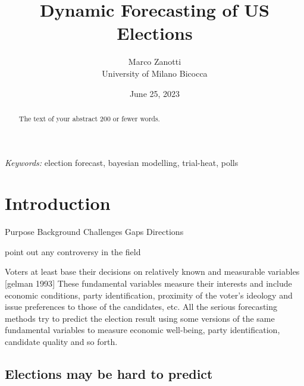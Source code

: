 \documentclass[
  12pt]{article}
\begin{document}
\def\spacingset#1{\renewcommand{\baselinestretch}%
{#1}\small\normalsize} \spacingset{1}



\date{June 25, 2023}
\title{\bf Dynamic Forecasting of US Elections}
\author{
Marco Zanotti\\
University of Milano Bicocca\\
}
\maketitle

\bigskip
\bigskip
\begin{abstract}
The text of your abstract 200 or fewer words.
\end{abstract}

\noindent%
{\it Keywords:} election forecast, bayesian modelling, trial-heat, polls
\vfill

\newpage
\spacingset{1.9} %
\ifdefined\Shaded\renewenvironment{Shaded}{\begin{tcolorbox}[sharp corners, breakable, enhanced, borderline west={3pt}{0pt}{shadecolor}, boxrule=0pt, interior hidden, frame hidden]}{\end{tcolorbox}}\fi

\hypertarget{sec-intro}{%
\section{Introduction}\label{sec-intro}}

Purpose Background Challenges Gaps Directions

point out any controversy in the field

Voters at least base their decisions on relatively known and measurable
variables {[}gelman 1993{]} These fundamental variables measure their
interests and include economic conditions, party identification,
proximity of the voter's ideology and issue preferences to those of the
candidates, etc. All the serious forecasting methods try to predict the
election result using some versions of the same fundamental variables to
measure economic well-being, party identification, candidate quality and
so forth.

\hypertarget{elections-may-be-hard-to-predict}{%
\subsection{Elections may be hard to
predict}\label{elections-may-be-hard-to-predict}}
\end{document}
